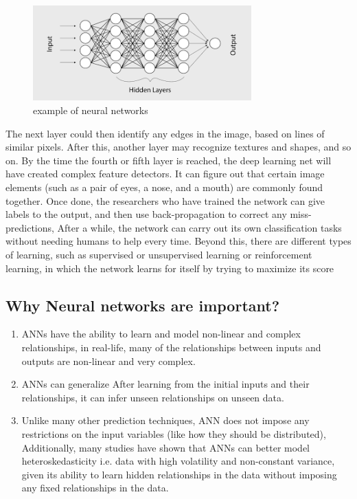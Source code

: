 \begin{figure}[H]
	\centering
	\includegraphics[width=0.75\textwidth]{CH1-introduction/sec3_neural_networks/nn.png}
	\caption{example of neural networks}
	\label{fig:nn}
\end{figure} 
The next layer could then identify any edges in the image, based on lines of similar pixels. After this, another layer may recognize textures and shapes, and so on. By the time the fourth or fifth layer is reached, the deep learning net will have created complex feature detectors. It can figure out that certain image elements (such as a pair of eyes, a nose, and a mouth) are commonly found together.\newline
Once done, the researchers who have trained the network can give labels to the output, and then use back-propagation to correct any miss-predictions, After a while, the network can carry out its own classification tasks without needing humans to help every time.
\newline
Beyond this, there are different types of learning, such as supervised or unsupervised learning or reinforcement learning, in which the network learns for itself by trying to maximize its score

\subsection{Why Neural networks are important? }
\begin{enumerate}
	\item ANNs have the ability to learn and model non-linear and complex relationships, in real-life, many of the relationships between inputs and outputs are non-linear and very complex.
	\item ANNs can generalize After learning from the initial inputs and their relationships, it can infer unseen relationships on unseen data.
	\item  Unlike many other prediction techniques, ANN does not impose any restrictions on the input variables (like how they should be distributed), Additionally, many studies have shown that ANNs can better model heteroskedasticity i.e. data with high volatility and non-constant variance, given its ability to learn hidden relationships in the data without imposing any fixed relationships in the data. 
	
\end{enumerate}
